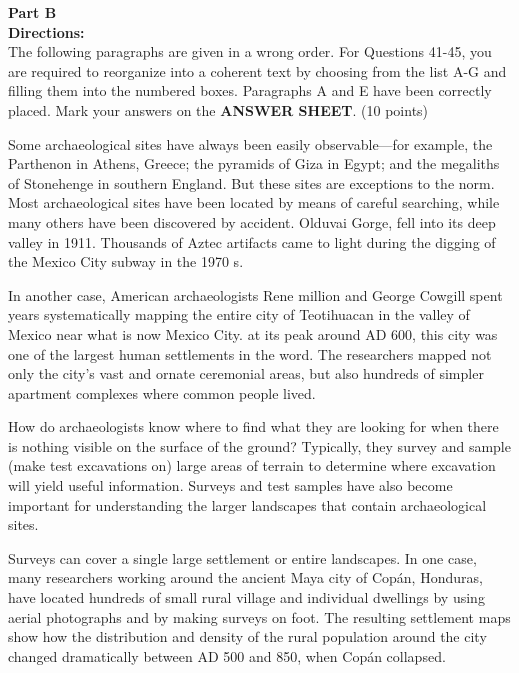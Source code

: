 \newpage
\noindent
\textbf{Part B}\\
\textbf{Directions:}\\
The following paragraphs are given in a wrong order. For
	Questions 41-45, you are required to reorganize into a coherent text by
	choosing from the list A-G and filling them into the numbered boxes. Paragraphs A and E have been correctly placed. Mark your answers on the \textbf{ANSWER SHEET}. (10 points)

\begin{listmatch}
	\item
Some archaeological sites have always been easily
observable---for example, the Parthenon in Athens, Greece; the pyramids
of Giza in Egypt; and the megaliths of Stonehenge in southern England.
But these sites are exceptions to the norm. Most archaeological sites
have been located by means of careful searching, while many others have
been discovered by accident. Olduvai Gorge, fell into its deep valley in
1911. Thousands of Aztec artifacts came to light during the digging of
the Mexico City subway in the 1970 s.


\item 
In another case, American archaeologists Rene million and George
Cowgill spent years systematically mapping the entire city of
Teotihuacan in the valley of Mexico near what is now Mexico City. at its
peak around AD 600, this city was one of the largest human settlements
in the word. The researchers mapped not only the city's vast and ornate
ceremonial areas, but also hundreds of simpler apartment complexes where
common people lived.


\item 
How do archaeologists know where to find what they are looking
for when there is nothing visible on the surface of the ground?
Typically, they survey and sample (make test excavations on) large areas
of terrain to determine where excavation will yield useful information.
Surveys and test samples have also become important for understanding
the larger landscapes that contain archaeological sites.


\item 
Surveys can cover a single large settlement or entire
landscapes. In one case, many researchers working around the ancient
Maya city of Copán, Honduras, have located hundreds of small rural
village and individual dwellings by using aerial photographs and by
making surveys on foot. The resulting settlement maps show how the
distribution and density of the rural population around the city changed
dramatically between AD 500 and 850, when Copán collapsed.



\end{listmatch}
